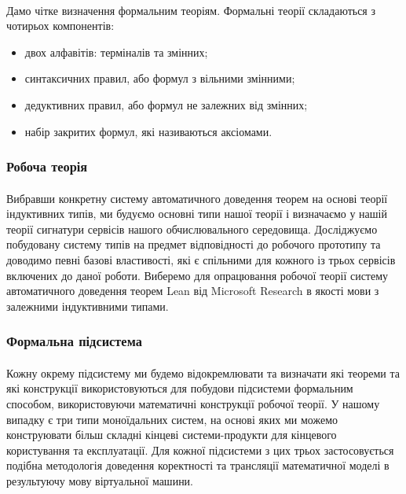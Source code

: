 \documentclass[11pt,oneside]{article}
\begin{document}
   \paragraph{}
   Дамо чітке визначення формальним теоріям. Формальні теорії складаються з чотирьох компонентів:

\begin{itemize}
   \item двох алфавітів: терміналів та змінних;
   \item синтаксичних правил, або формул з вільними змінними;
   \item дедуктивних правил, або формул не залежних від змінних;
   \item набір закритих формул, які називаються аксіомами.
\end{itemize}

\paragraph{}

\subsubsection{Робоча теорія}

   \paragraph{}
   Вибравши конкретну систему автоматичного доведення теорем на основі теорії індуктивних типів,
   ми будуємо основні типи нашої теорії і визначаємо у нашій теорії сигнатури сервісів
   нашого обчислювального середовища. Досліджуємо побудовану систему типів на предмет
   відповідності до робочого прототипу та доводимо певні базові властивості, які є спільними для кожного із трьох
   сервісів включених до даної роботи. Виберемо для опрацювання робочої теорії
   систему автоматичного доведення теорем Lean від Microsoft Research в якості мови
   з залежними індуктивними типами.

\subsubsection{Формальна підсистема}

   \paragraph{}
   Кожну окрему підсистему ми будемо відокремлювати та визначати які теореми
   та які конструкції використовуються для побудови підсистеми формальним способом,
   використовуючи математичні конструкції робочої теорії. У нашому випадку є три
   типи моноїдальних систем, на основі яких ми можемо конструювати більш складні
   кінцеві системи-продукти для кінцевого користування та експлуатації.
   Для кожної підсистеми з цих трьох застосовується подібна методологія
   доведення коректності та трансляції математичної моделі в результуючу
   мову віртуальної машини.
\end{document}
